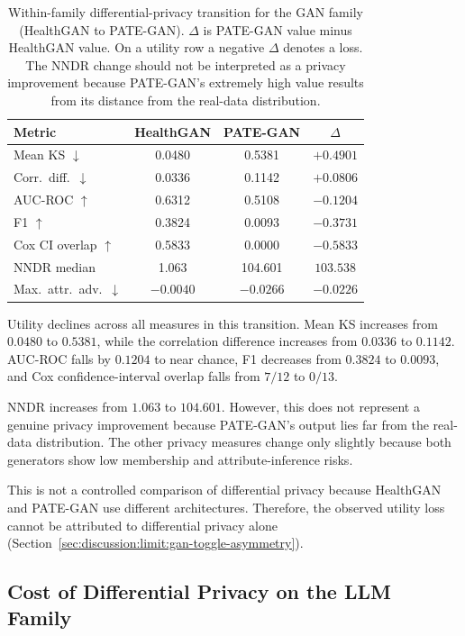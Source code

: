 \begin{table}[H]
\centering
\small
\caption{Within-family differential-privacy transition for the GAN family
(HealthGAN to PATE-GAN). $\Delta$ is PATE-GAN value minus 
HealthGAN value. On a utility row a negative $\Delta$ denotes a loss. 
The NNDR change should not be interpreted as a privacy improvement because
PATE-GAN's extremely high value results from its distance from the
real-data distribution. }
\label{tab:rq3:gan-toggle}
\begin{tabular}{lccc}
\toprule
Metric & HealthGAN & PATE-GAN & $\Delta$ \\
\midrule
Mean KS $\downarrow$       & 0.0480 & 0.5381 & $+0.4901$ \\
Corr.\ diff.\ $\downarrow$ & 0.0336 & 0.1142 & $+0.0806$ \\
AUC-ROC $\uparrow$         & 0.6312 & 0.5108 & $-0.1204$ \\
F1 $\uparrow$              & 0.3824 & 0.0093 & $-0.3731$ \\
Cox CI overlap $\uparrow$  & 0.5833 & 0.0000 & $-0.5833$ \\
NNDR median                & 1.063  & 104.601 & $103.538$ \\
Max.\ attr.\ adv.\ $\downarrow$ & $-0.0040$ & $-0.0266$ & $-0.0226$ \\
\bottomrule
\end{tabular}
\end{table}

Utility declines across all measures in this transition. Mean KS increases
from $0.0480$ to $0.5381$, while the correlation difference increases from
$0.0336$ to $0.1142$. AUC-ROC falls by $0.1204$ to near chance, F1
decreases from $0.3824$ to $0.0093$, and Cox confidence-interval overlap
falls from $7/12$ to $0/13$.

NNDR increases from $1.063$ to $104.601$. However, this does not represent
a genuine privacy improvement because PATE-GAN's output lies far from the
real-data distribution. The other privacy measures
change only slightly because both generators show low membership and
attribute-inference risks.

This is not a controlled comparison of differential privacy because
HealthGAN and PATE-GAN use different architectures. Therefore, the
observed utility loss cannot be attributed to differential privacy alone
(Section~\ref{sec:discussion:limit:gan-toggle-asymmetry}).

\subsection{Cost of Differential Privacy on the LLM Family}
\label{sec:results:rq3:llm-toggle}

